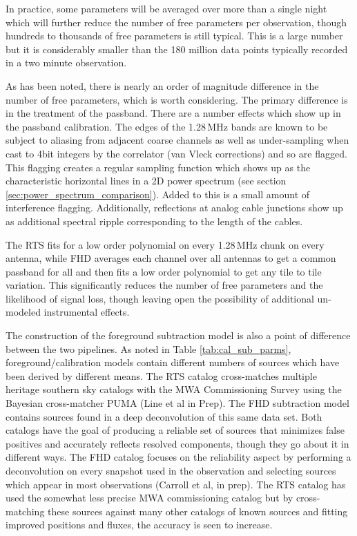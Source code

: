 \documentclass[twolcolumn,iop]{emulateapj}
\begin{document}
In practice, some parameters will be averaged over more than a single night which will further reduce the number of free parameters per observation, though hundreds to thousands of free parameters is still typical. This is a large number but it is considerably smaller than the 180 million data points typically recorded in a two minute observation. 

As has been noted, there is nearly an order of magnitude difference in the number of free parameters, which is worth considering. The primary difference is in the treatment of the passband.  There are a number effects which show up in the passband calibration. The edges of the 1.28\,MHz bands are known to be subject to aliasing from adjacent coarse channels as well as under-sampling when cast to 4bit integers by the correlator (van Vleck corrections) and so are flagged. This flagging creates a regular sampling function which shows up as the characteristic horizontal lines in a 2D power spectrum (see section \ref{sec:power_spectrum_comparison}). Added to this is a small amount of interference flagging.  Additionally, reflections at analog cable junctions show up as additional spectral ripple corresponding to the length of the cables.    

The RTS fits for a low order polynomial on every 1.28\,MHz chunk on every antenna, while FHD averages each channel over all antennas to get a common passband for all and then fits a low order polynomial to get any tile to tile variation. This significantly reduces the number of free parameters and the likelihood of signal loss, though leaving open the possibility of additional un-modeled instrumental effects.


The construction of the foreground subtraction model is also a point of difference between the two pipelines.
As noted in Table \ref{tab:cal_sub_parms}, foreground/calibration models contain different numbers of sources which have been derived by different means. The RTS catalog cross-matches multiple heritage southern sky catalogs with the MWA Commissioning Survey using the Bayesian cross-matcher PUMA (Line et al in Prep).  The FHD subtraction model contains sources found in a deep deconvolution of this same data set. Both catalogs have the goal of producing a reliable set of sources that minimizes false positives and accurately reflects resolved components, though they go about it in different ways. The FHD catalog focuses on the reliability aspect by performing a deconvolution on every snapshot used in the observation and selecting sources which appear in most observations (Carroll et al, in prep). The RTS catalog has used the somewhat less precise MWA commissioning catalog but by cross-matching these sources against many other catalogs of known sources and fitting improved positions and fluxes, the accuracy is seen to increase.
\end{document}
